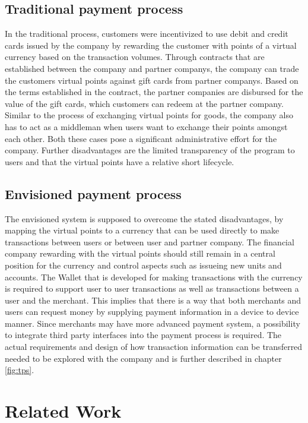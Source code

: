 \subsection{Traditional payment process}
In the traditional process, customers were incentivized to use debit and credit cards issued by the company by rewarding the customer with points of a virtual currency based on the transaction volumes.
Through contracts that are established between the company and partner companys, the company can trade the customers virtual points against gift cards from partner companys.
Based on the terms established in the contract, the partner companies are disbursed for the value of the gift cards, which customers can redeem at the partner company.
Similar to the process of exchanging virtual points for goods, the company also has to act as a middleman when users want to exchange their points amongst each other. Both these cases pose a significant administrative effort for the company. Further disadvantages are the limited transparency of the program to users and that the virtual points have a relative short lifecycle.

\subsection{Envisioned payment process}
The envisioned system is supposed to overcome the stated disadvantages, by mapping the virtual points to a currency that can be used directly to make transactions between users or between user and partner company.
The financial company rewarding with the virtual points should still remain in a central position for the currency and control aspects such as issueing new units and accounts.
The Wallet that is developed for making transactions with the currency is required to support user to user transactions as well as transactions between a user and the merchant. This implies that there is a way that both merchants and users can request money by supplying payment information in a device to device manner. Since merchants may have more advanced payment system, a possibility to integrate third party interfaces into the payment process is required. The actual requirements and design of how transaction information can be transferred needed to be explored with the company and is further described in chapter \ref{fig:tps}.


\section{Related Work}
